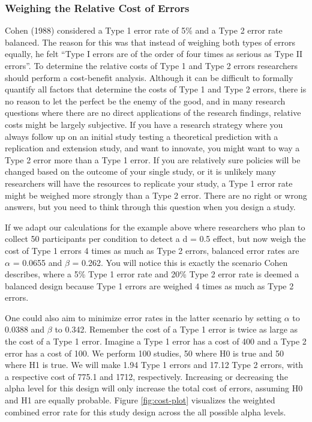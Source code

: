 \documentclass[,jou,floatsintext]{apa6}
\begin{document}
\hypertarget{weighing-the-relative-cost-of-errors}{%
\subsubsection{Weighing the Relative Cost of Errors}\label{weighing-the-relative-cost-of-errors}}

Cohen (1988) considered a Type 1 error rate of 5\% and a Type 2 error rate balanced. The reason for this was that instead of weighing both types of errors equally, he felt \enquote{Type I errors are of the order of four times as serious as Type II errors}. To determine the relative costs of Type 1 and Type 2 errors researchers should perform a cost-benefit analysis. Although it can be difficult to formally quantify all factors that determine the costs of Type 1 and Type 2 errors, there is no reason to let the perfect be the enemy of the good, and in many research questions where there are no direct applications of the research findings, relative costs might be largely subjective. If you have a research strategy where you always follow up on an initial study testing a theoretical prediction with a replication and extension study, and want to innovate, you might want to way a Type 2 error more than a Type 1 error. If you are relatively sure policies will be changed based on the outcome of your single study, or it is unlikely many researchers will have the resources to replicate your study, a Type 1 error rate might be weighed more strongly than a Type 2 error. There are no right or wrong answers, but you need to think through this question when you design a study.

If we adapt our calculations for the example above where researchers who plan to collect 50 participants per condition to detect a d = 0.5 effect, but now weigh the cost of Type 1 errors 4 times as much as Type 2 errors, balanced error rates are \(\alpha\) = 0.0655 and \(\beta\) = 0.262. You will notice this is exactly the scenario Cohen describes, where a 5\% Type 1 error rate and 20\% Type 2 error rate is deemed a balanced design because Type 1 errors are weighed 4 times as much as Type 2 errors.

One could also aim to minimize error rates in the latter scenario by setting \(\alpha\) to 0.0388 and \(\beta\) to 0.342. Remember the cost of a Type 1 error is twice as large as the cost of a Type 1 error. Imagine a Type 1 error has a cost of 400 and a Type 2 error has a cost of 100. We perform 100 studies, 50 where H0 is true and 50 where H1 is true. We will make 1.94 Type 1 errors and 17.12 Type 2 errors, with a respective cost of 775.1 and 1712, respectively. Increasing or decreasing the alpha level for this design will only increase the total cost of errors, assuming H0 and H1 are equally probable. Figure \ref{fig:cost-plot} visualizes the weighted combined error rate for this study design across the all possible alpha levels.
\end{document}
